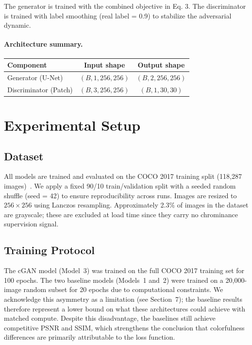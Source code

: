 \documentclass[11pt,a4paper]{article}
\begin{document}
The generator is trained with the combined objective in Eq. 3.
The discriminator is trained with label smoothing (real label = 0.9) to
stabilize the adversarial dynamic.

\paragraph{Architecture summary.}

\begin{center}
\begin{tabular}{lcc}
\toprule
\textbf{Component} & \textbf{Input shape} & \textbf{Output shape} \\
\midrule
Generator (U-Net)    & $(B, 1, 256, 256)$ & $(B, 2, 256, 256)$ \\
Discriminator (Patch) & $(B, 3, 256, 256)$ & $(B, 1, 30, 30)$ \\
\bottomrule
\end{tabular}
\end{center}

\section{Experimental Setup}

\subsection{Dataset}

All models are trained and evaluated on the COCO 2017 training split
(118,287 images)~\cite{lin2014coco}. We apply a fixed 90/10 train/validation
split with a seeded random shuffle (seed = 42) to ensure reproducibility across
runs. Images are resized to $256\times256$ using Lanczos resampling.
Approximately 2.3\% of images in the dataset are grayscale; these are excluded
at load time since they carry no chrominance supervision signal.

\subsection{Training Protocol}

The cGAN model (Model~3) was trained on the full COCO 2017 training set for
100 epochs. The two baseline models (Models~1 and~2) were trained on a
20,000-image random subset for 20 epochs due to computational constraints.
We acknowledge this asymmetry as a limitation (see Section~7); the baseline
results therefore represent a lower bound on what these architectures could
achieve with matched compute. Despite this disadvantage, the baselines still
achieve competitive PSNR and SSIM, which strengthens the conclusion that
colorfulness differences are primarily attributable to the loss function.
\end{document}
